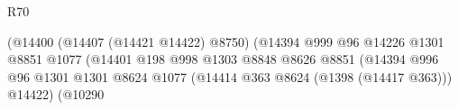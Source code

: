 \begin{lexlean}{R70}
\begin{coremodule}
                                                                      (@14400
                                                                        (@14407
                                                                          (@14421 @14422)
                                                                          @8750)
                                                                        (@14394
                                                                          @999
                                                                          @96
                                                                          @14226
                                                                          @1301
                                                                          @8851
                                                                          @1077
                                                                          (@14401
                                                                            @198
                                                                            @998
                                                                            @1303
                                                                            @8848
                                                                            @8626
                                                                            @8851
                                                                            (@14394
                                                                              @996
                                                                              @96
                                                                              @1301
                                                                              @1301
                                                                              @8624
                                                                              @1077
                                                                              (@14414
                                                                                @363
                                                                                @8624
                                                                                (@1398
                                                                                  (@14417 @363)))
                                                                              @14422)
                                                                            (@10290

\end{coremodule}
\end{lexlean}
